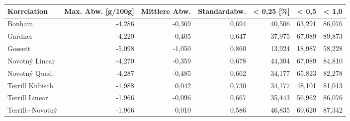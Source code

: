 \begin{tabular}{lrrrrrr}
\toprule
    Korrelation &  Max. Abw. [g/100g] &  Mittlere Abw. &  Standardabw. &  < 0,25 [\%] &  < 0,5 &  < 1,0 \\
\midrule
         Bonham &              -4,286 &         -0,369 &         0,694 &      40,506 & 63,291 & 86,076 \\
        Gardner &              -4,220 &         -0,405 &         0,647 &      37,975 & 67,089 & 89,873 \\
        Gossett &              -5,098 &         -1,050 &         0,860 &      13,924 & 18,987 & 58,228 \\
 Novotný Linear &              -4,270 &         -0,359 &         0,678 &      44,304 & 67,089 & 84,810 \\
  Novotný Quad. &              -4,287 &         -0,485 &         0,662 &      34,177 & 65,823 & 82,278 \\
Terrill Kubisch &              -1,988 &          0,042 &         0,730 &      34,177 & 48,101 & 81,013 \\
 Terrill Linear &              -1,966 &         -0,096 &         0,667 &      35,443 & 56,962 & 86,076 \\
Terrill+Novotný &              -1,966 &          0,010 &         0,586 &      46,835 & 69,620 & 87,342 \\
\bottomrule
\end{tabular}
